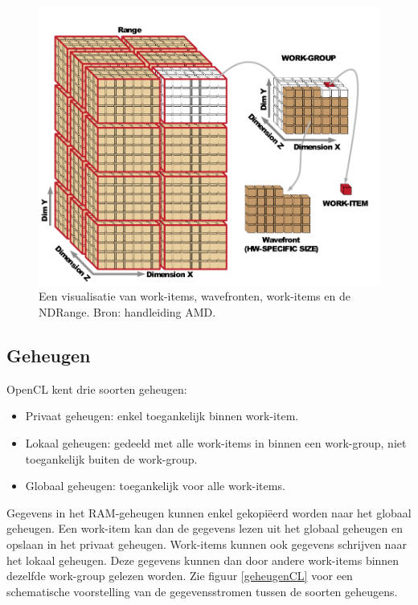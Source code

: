 \begin{figure}[]
\centering
\includegraphics{workitem}
\caption{\label{workitem}Een visualisatie van work-items, wavefronten, work-items en de NDRange. Bron: handleiding AMD\cite[p.~1-9]{amd}.}
\end{figure}

\subsection{Geheugen}
\label{h:opencl:geheugen}
OpenCL kent drie soorten geheugen:
\begin{itemize}
    \item Privaat geheugen: enkel toegankelijk binnen work-item.
    \item Lokaal geheugen: gedeeld met alle work-items in binnen een work-group, niet toegankelijk buiten de work-group.
    \item Globaal geheugen: toegankelijk voor alle work-items.
\end{itemize}

Gegevens in het RAM-geheugen kunnen enkel gekopi\"eerd worden naar het globaal geheugen. Een work-item kan dan de gegevens lezen uit het globaal geheugen en opslaan in het privaat geheugen. Work-items kunnen ook gegevens schrijven naar het lokaal geheugen. Deze gegevens kunnen dan door andere work-items binnen dezelfde work-group gelezen worden. Zie figuur \ref{geheugenCL} voor een schematische voorstelling van de gegevensstromen tussen de soorten geheugens.

